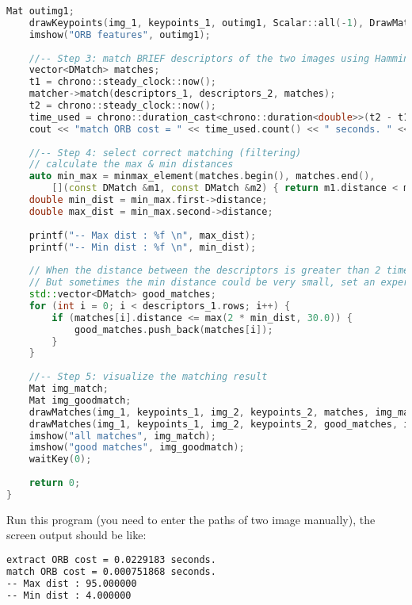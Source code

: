 \begin{lstlisting}[language=c++,caption=slambook2/ch7/orb_cv.cpp]
    Mat outimg1;
    drawKeypoints(img_1, keypoints_1, outimg1, Scalar::all(-1), DrawMatchesFlags::DEFAULT);
    imshow("ORB features", outimg1);
    
    //-- Step 3: match BRIEF descriptors of the two images using Hamming distance
    vector<DMatch> matches;
    t1 = chrono::steady_clock::now();
    matcher->match(descriptors_1, descriptors_2, matches);
    t2 = chrono::steady_clock::now();
    time_used = chrono::duration_cast<chrono::duration<double>>(t2 - t1);
    cout << "match ORB cost = " << time_used.count() << " seconds. " << endl;
    
    //-- Step 4: select correct matching (filtering)
    // calculate the max & min distances
    auto min_max = minmax_element(matches.begin(), matches.end(),
        [](const DMatch &m1, const DMatch &m2) { return m1.distance < m2.distance; });
    double min_dist = min_max.first->distance;
    double max_dist = min_max.second->distance;
    
    printf("-- Max dist : %f \n", max_dist);
    printf("-- Min dist : %f \n", min_dist);
    
	// When the distance between the descriptors is greater than 2 times the min distance, we treat the matching as wrong. 
	// But sometimes the min distance could be very small, set an experience value of 30 as the lower bound.
    std::vector<DMatch> good_matches;
    for (int i = 0; i < descriptors_1.rows; i++) {
        if (matches[i].distance <= max(2 * min_dist, 30.0)) {
            good_matches.push_back(matches[i]);
        }
    }
    
    //-- Step 5: visualize the matching result
    Mat img_match;
    Mat img_goodmatch;
    drawMatches(img_1, keypoints_1, img_2, keypoints_2, matches, img_match);
    drawMatches(img_1, keypoints_1, img_2, keypoints_2, good_matches, img_goodmatch);
    imshow("all matches", img_match);
    imshow("good matches", img_goodmatch);
    waitKey(0);
    
    return 0;
}
\end{lstlisting}

Run this program (you need to enter the paths of two image manually), the screen output should be like:
\begin{lstlisting}[language=sh,caption=终端输入：]
% build/orb_cv 1.png 2.png
extract ORB cost = 0.0229183 seconds. 
match ORB cost = 0.000751868 seconds.
-- Max dist : 95.000000 
-- Min dist : 4.000000 
\end{lstlisting}

